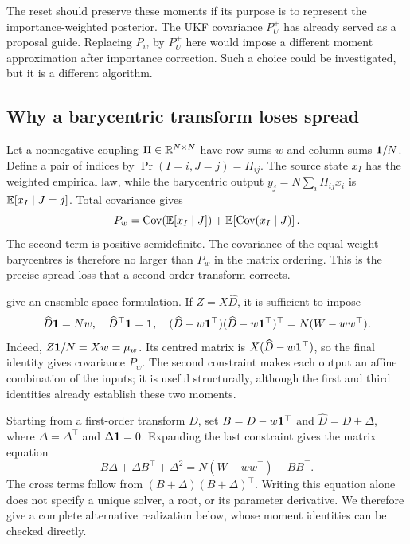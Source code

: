 The reset should preserve these moments if its purpose is to represent
the importance-weighted posterior. The UKF covariance \(P_U^+\) has already
served as a proposal guide. Replacing \(P_w\) by \(P_U^+\) here would impose
a different moment approximation after importance correction. Such a
choice could be investigated, but it is a different algorithm.

\subsection{Why a barycentric transform loses spread}

Let a nonnegative coupling \(\Pi\in\mathbb R^{N\times N}\) have row sums \(w\)
and column sums \(\mathbf 1/N\). Define a pair of indices by
\(\Pr(I=i,J=j)=\Pi_{ij}\). The source state \(x_I\) has the weighted
empirical law, while the barycentric output
\(y_j=N\sum_i\Pi_{ij}x_i\) is \(\mathbb E[x_I\mid J=j]\). Total covariance gives
\begin{equation}
\label{eq:bf-covariance-proposal-barycentric-loss}
 P_w
 =\operatorname{Cov}\!\left(\mathbb E[x_I\mid J]\right)
  +\mathbb E\!\left[\operatorname{Cov}(x_I\mid J)\right].
\end{equation}
The second term is positive semidefinite. The covariance of the equal-weight
barycentres is therefore no larger than \(P_w\) in the matrix ordering.
This is the precise spread loss that a second-order transform corrects.

\citet[Definition 3.1 and Sections 4--6]{acevedodewiljesreich2017secondorder} give an ensemble-space
formulation. If \(Z=X\widehat D\), it is sufficient to impose
\begin{equation}
\label{eq:bf-covariance-proposal-transform-constraints}
 \widehat D\mathbf 1=Nw,\quad
 \widehat D^\top\mathbf 1=\mathbf 1,\quad
 (\widehat D-w\mathbf 1^\top)(\widehat D-w\mathbf 1^\top)^\top
       =N(W-ww^\top).
\end{equation}
Indeed, \(Z\mathbf 1/N=Xw=\mu_w\). Its centred matrix is
\(X(\widehat D-w\mathbf 1^\top)\), so the final identity gives covariance \(P_w\).
The second constraint makes each output an affine combination of the inputs;
it is useful structurally, although the first and third identities already
establish these two moments.

Starting from a first-order transform \(D\), set \(B=D-w\mathbf 1^\top\) and
\(\widehat D=D+\Delta\), where \(\Delta=\Delta^\top\) and
\(\Delta\mathbf 1=0\). Expanding the last constraint gives the matrix equation
\begin{equation}
\label{eq:bf-covariance-proposal-riccati-correction}
 B\Delta+\Delta B^\top+\Delta^2
   =N(W-ww^\top)-BB^\top.
\end{equation}
The cross terms follow from \((B+\Delta)(B+\Delta)^\top\).
Writing this equation alone does not specify a unique solver, a root,
or its parameter derivative. We therefore give a complete alternative
realization below, whose moment identities can be checked directly.

